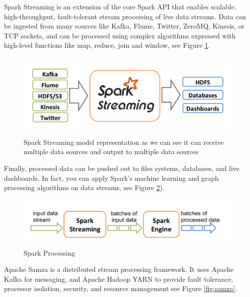 \documentclass[twoside,12pt, a4paper]{report}
\begin{document}
Spark Streaming \cite{spark} is an extension of the core Spark API
\cite{shoro2015big} that enables scalable, high-throughput, fault-tolerant
stream processing of live data streams. Data can be ingested
from many sources like Kafka, Flume, Twitter, ZeroMQ,
Kinesis, or TCP sockets, and can be processed using
complex algorithms expressed with high-level functions like
map, reduce, join and window, see Figure \ref{fig:streams}.

\begin{figure}[!h]
    \centering
    \includegraphics[width=1\linewidth]{figures/streaming-arch.png}
    \caption{\cite{spark} Spark Streaming model representation as we can see it can receive multiple data sources and output to multiple data sources}
    \label{fig:streams}
\end{figure}



Finally, processed data can be pushed out to files systems,
databases, and live dashboards. In fact, you can apply
Spark’s machine learning and graph processing algorithms
on data streams, see Figure \ref{fig:procs}).

\begin{figure}[!h]
    \centering
    \includegraphics[width=1\linewidth]{figures/streaming-flow.png}
    \caption{\cite{spark} Spark Processing}
    \label{fig:procs}
\end{figure}



\cite{namiot2015big}
Apache Samza \cite{samza} is a distributed stream processing
framework. It uses Apache Kafka for messaging, and
Apache Hadoop YARN to provide fault tolerance, processor
isolation, security, and resource management see Figure \ref{fig:samza}.
\end{document}

